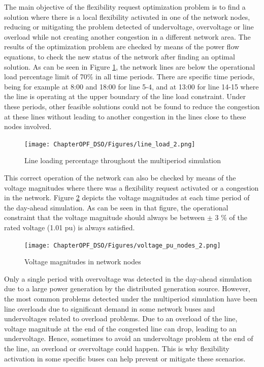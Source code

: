 The main objective of the flexibility request optimization problem is to find a solution where there is a local flexibility activated in one of the network nodes, reducing or mitigating the problem detected of undervoltage, overvoltage or line overload while not creating another congestion in a different network area. 
The results of the optimization problem are checked by means of the power flow equations, to check the new status of the network after finding an optimal solution. As can be seen in Figure \ref{fig:line_load}, the network lines are below the operational load percentage limit of 70\% in all time periods. There are specific time periods, being for example at 8:00 and 18:00 for line 5-4, and at 13:00 for line 14-15 where the line is operating at the upper boundary of the line load constraint. Under these periods, other feasible solutions could not be found to reduce the congestion at these lines without leading to another congestion in the lines close to these nodes involved. 

\begin{figure}[htbp]
	\centering
	\texttt{[image: ChapterOPF\_DSO/Figures/line\_load\_2.png]}
	\caption{Line loading percentage throughout the multiperiod simulation}
	\label{fig:line_load}  
\end{figure}

This correct operation of the network can also be checked by means of the voltage magnitudes where there was a flexibility request activated or a congestion in the network. Figure \ref{fig:voltage_magnitudes} depicts the voltage magnitudes at each time period of the day-ahead simulation. As  can be seen in that figure, the operational constraint that the voltage magnitude should always be between $\pm$ 3 \% of the rated voltage (1.01 pu) is always satisfied.
 
\begin{figure}[htbp]
	\centering
	\texttt{[image: ChapterOPF\_DSO/Figures/voltage\_pu\_nodes\_2.png]}
	\caption{Voltage magnitudes in network nodes}
	\label{fig:voltage_magnitudes}  
\end{figure}

Only a single period with overvoltage was detected in the day-ahead simulation due to a large power generation by the distributed generation source. However, the most common problems detected under the multiperiod simulation have been line overloads due to significant demand in some network buses and undervoltages related to overload problems. Due to an overload of the line, voltage magnitude at the end of the congested line can drop, leading to an undervoltage. Hence, sometimes to avoid an undervoltage problem at the end of the line, an overload or overvoltage could happen. This is why flexibility activation in some specific buses can help prevent or mitigate these scenarios. 

